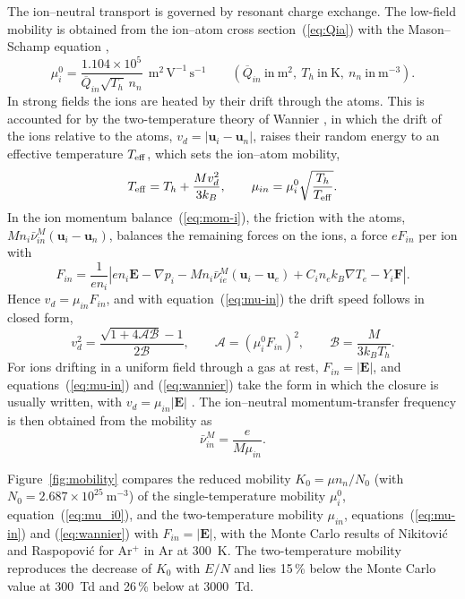 The ion--neutral transport is governed by resonant charge exchange. The low-field mobility is obtained from the ion--atom cross section~(\ref{eq:Qia}) with the Mason--Schamp equation \cite{mason1958mobility},
\begin{equation}
\mu_i^0=\frac{1.104\times10^{5}}{\overline{Q}_{in}\sqrt{T_h}\,n_n}\ \ \mathrm{m^2\,V^{-1}\,s^{-1}}
\qquad(\overline{Q}_{in}\ \mathrm{in\ m^2},\ T_h\ \mathrm{in\ K},\ n_n\ \mathrm{in\ m^{-3}}).
\label{eq:mu_i0}
\end{equation}
In strong fields the ions are heated by their drift through the atoms. This is accounted for by the two-temperature theory of Wannier \cite{mancinelli2018modelling,viehland1978gaseous}, in which the drift of the ions relative to the atoms, \(v_d=|\mathbf{u}_i-\mathbf{u}_n|\), raises their random energy to an effective temperature \(T_{\rm eff}\), which sets the ion--atom mobility,
\begin{equation}
T_{\rm eff}=T_h+\frac{Mv_d^2}{3k_B},\qquad
\mu_{in}=\mu_i^0\sqrt{\frac{T_h}{T_{\rm eff}}} .
\label{eq:mu-in}
\end{equation}
In the ion momentum balance~(\ref{eq:mom-i}), the friction with the atoms, \(Mn_i\bar\nu^M_{in}(\mathbf{u}_i-\mathbf{u}_n)\), balances the remaining forces on the ions, a force \(eF_{in}\) per ion with
\begin{equation*}
F_{in}=\frac{1}{en_i}\left|en_i\mathbf{E}-\nabla p_i-Mn_i\bar\nu^M_{ie}(\mathbf{u}_i-\mathbf{u}_e)+C_in_ek_B\nabla T_e-Y_i\mathbf{F}\right| .
\end{equation*}
Hence \(v_d=\mu_{in}F_{in}\), and with equation~(\ref{eq:mu-in}) the drift speed follows in closed form,
\begin{equation}
v_d^2=\frac{\sqrt{1+4\mathcal{A}\mathcal{B}}-1}{2\mathcal{B}},\qquad
\mathcal{A}=\left(\mu_i^0F_{in}\right)^2,\qquad
\mathcal{B}=\frac{M}{3k_BT_h}.
\label{eq:wannier}
\end{equation}
For ions drifting in a uniform field through a gas at rest, \(F_{in}=|\mathbf{E}|\), and equations~(\ref{eq:mu-in}) and (\ref{eq:wannier}) take the form in which the closure is usually written, with \(v_d=\mu_{in}|\mathbf{E}|\) \cite{mancinelli2018modelling}. The ion--neutral momentum-transfer frequency is then obtained from the mobility as
\begin{equation}
\bar\nu^M_{in}=\frac{e}{M\mu_{in}} .
\label{eq:nu-in}
\end{equation}

Figure~\ref{fig:mobility} compares the reduced mobility \(K_0=\mu n_n/N_0\) (with \(N_0=2.687\times10^{25}\ \mathrm{m^{-3}}\)) of the single-temperature mobility \(\mu_i^0\), equation~(\ref{eq:mu_i0}), and the two-temperature mobility \(\mu_{in}\), equations~(\ref{eq:mu-in}) and (\ref{eq:wannier}) with \(F_{in}=|\mathbf{E}|\), with the Monte Carlo results of Nikitovi\'c and Raspopovi\'c \cite{nikitovic2026cross} for Ar\(^+\) in Ar at 300~K. The two-temperature mobility reproduces the decrease of \(K_0\) with \(E/N\) and lies 15\,\% below the Monte Carlo value at 300~Td and 26\,\% below at 3000~Td.

